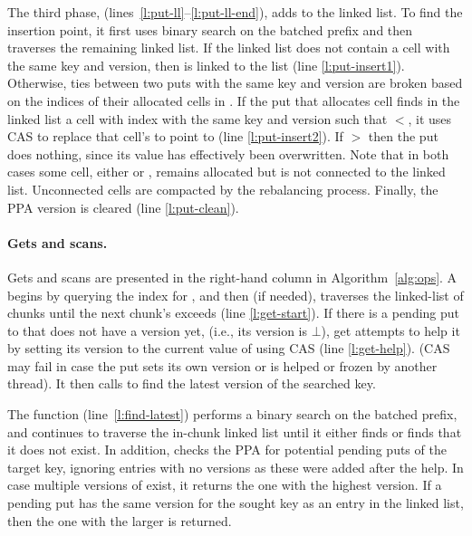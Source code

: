 The third phase, (lines~\ref{l:put-ll}--\ref{l:put-ll-end}), adds  to the linked list.
To find the insertion point, it first uses binary search on the batched prefix and then traverses the remaining linked list.
If the linked list does not contain a cell with the same key and version, then  is linked to the list (line \ref{l:put-insert1}).
Otherwise, ties between two puts with the same key and version are broken based on the indices of their allocated cells in .
If the put that allocates cell  finds in the linked list a cell with index  with the same key and version such that $<$,
it uses CAS to replace that cell's  to point to  (line \ref{l:put-insert2}).
If $>$ then the put does nothing, since its value has effectively been overwritten.
Note that in both cases some cell, either  or , remains allocated but is not connected to the linked list.
Unconnected cells are compacted by the  rebalancing process.
Finally, the PPA version is cleared (line \ref{l:put-clean}).

\paragraph{Gets and scans.}

Gets and scans are presented in the right-hand column in Algorithm~\ref{alg:ops}.
A  begins by querying the index for , and then (if needed), traverses the linked-list of chunks until
the next chunk's  exceeds  (line \ref{l:get-start}).
If there is a pending put to  that does not have a version yet, (i.e., its version is $\bot$), get attempts to help it by setting its version to
the current value of  using CAS  (line \ref{l:get-help}). (CAS may fail in case the put sets its own version or is helped or frozen by another thread).
It then calls   to find the latest version of the searched key.

The  function (line~\ref{l:find-latest}) performs a binary search on the batched prefix, and continues to traverse the in-chunk linked list until it either finds   or finds that it does not exist. In addition,  checks the PPA for potential pending puts of the target key,
ignoring entries with no versions as these were added after the help.
In case multiple versions of  exist, it returns the one with the highest version.
If a pending put has the same version for the sought key as an entry in the linked list, then the one with the larger  is returned.

